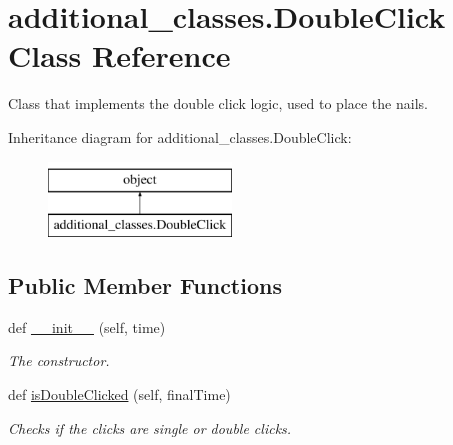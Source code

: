 \hypertarget{classadditional__classes_1_1DoubleClick}{}\section{additional\+\_\+classes.\+Double\+Click Class Reference}
\label{classadditional__classes_1_1DoubleClick}


Class that implements the double click logic, used to place the nails.  


Inheritance diagram for additional\+\_\+classes.\+Double\+Click\+:\begin{figure}[H]
\begin{center}
\leavevmode
\includegraphics[height=2.000000cm]{classadditional__classes_1_1DoubleClick}
\end{center}
\end{figure}
\subsection*{Public Member Functions}
\begin{DoxyCompactItemize}
\item 
\mbox{\label{classadditional__classes_1_1DoubleClick_aeda7ebb4d2db48777c252d470eeb180e}} 
def \hyperlink{classadditional__classes_1_1DoubleClick_aeda7ebb4d2db48777c252d470eeb180e}{\+\_\+\+\_\+init\+\_\+\+\_\+} (self, time)
\begin{DoxyCompactList}\small\item\em The constructor. \end{DoxyCompactList}\item 
\mbox{\label{classadditional__classes_1_1DoubleClick_a428626cbc162531871957a35bcaa8b19}} 
def \hyperlink{classadditional__classes_1_1DoubleClick_a428626cbc162531871957a35bcaa8b19}{is\+Double\+Clicked} (self, final\+Time)
\begin{DoxyCompactList}\small\item\em Checks if the clicks are single or double clicks. \end{DoxyCompactList}\end{DoxyCompactItemize}
